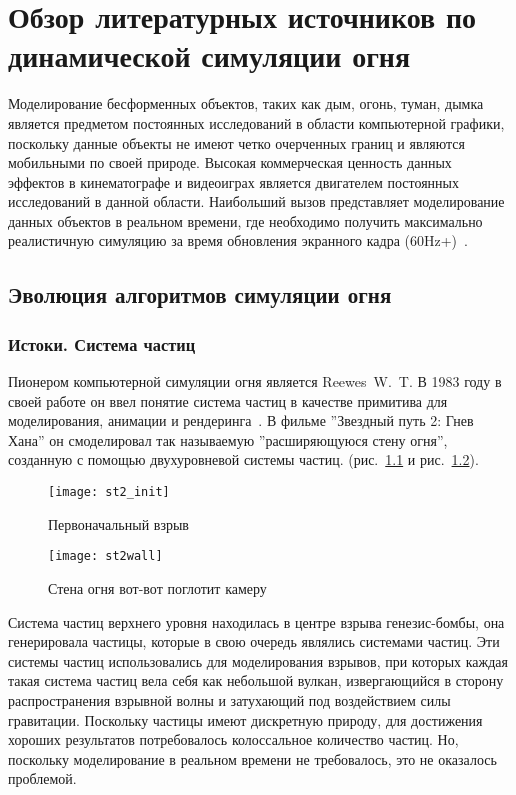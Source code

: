 \chapter{Обзор литературных источников по динамической симуляции огня}

Моделирование бесформенных объектов, таких как дым, огонь, туман, дымка является
предметом постоянных исследований в области компьютерной графики, поскольку
данные объекты не имеют четко очерченных границ и являются мобильными по своей
природе. Высокая коммерческая ценность данных эффектов в кинематографе и
видеоиграх является двигателем постоянных исследований в данной области.
Наибольший вызов представляет моделирование данных объектов в реальном времени,
где необходимо получить максимально реалистичную симуляцию за время обновления
экранного кадра (60Hz+)~\cite{lec17}.

\section{Эволюция алгоритмов симуляции огня}
\subsection{Истоки. Система частиц}
Пионером компьютерной симуляции огня является Reewes~W.~T. В 1983 году в своей
работе он ввел понятие система частиц в качестве примитива для моделирования,
анимации и рендеринга~\cite{reewes1983}. В фильме ''Звездный путь 2: Гнев Хана''
он смоделировал так называемую ''расширяющуюся стену огня'', созданную с помощью
двухуровневой системы частиц.
(рис.~\ref{fig:reeves_1} и рис.~\ref{fig:reeves_2}).
\begin{figure}[htb]
	\centering
	\texttt{[image: st2\_init]}
	\caption{Первоначальный взрыв}%
    \label{fig:reeves_1}
\end{figure}
\begin{figure}[htb]
	\centering
	\texttt{[image: st2wall]}
	\caption{Стена огня вот-вот поглотит камеру}%
    \label{fig:reeves_2}
\end{figure}
Система частиц верхнего уровня находилась в центре взрыва генезис-бомбы, она
генерировала частицы, которые в свою очередь являлись системами частиц.  Эти
системы частиц использовались для моделирования взрывов, при которых каждая
такая система частиц вела себя как небольшой вулкан, извергающийся в сторону
распространения взрывной волны и затухающий под воздействием силы гравитации.
Поскольку частицы имеют дискретную природу, для достижения хороших результатов
потребовалось колоссальное количество частиц. Но, поскольку моделирование в
реальном времени не требовалось, это не оказалось проблемой.


